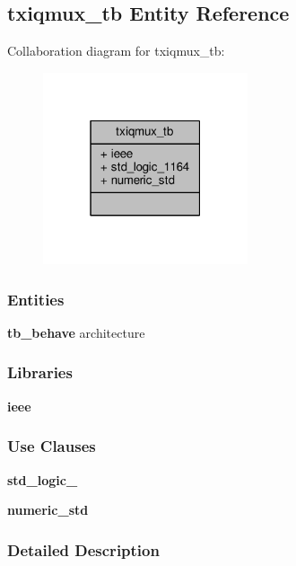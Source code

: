 \subsection{txiqmux\+\_\+tb Entity Reference}
\label{classtxiqmux__tb}


Collaboration diagram for txiqmux\+\_\+tb\+:\nopagebreak
\begin{figure}[H]
\begin{center}
\leavevmode
\includegraphics[width=171pt]{d8/d8e/classtxiqmux__tb__coll__graph}
\end{center}
\end{figure}
\subsubsection*{Entities}
\begin{DoxyCompactItemize}
\item 
{\bf tb\+\_\+behave} architecture
\end{DoxyCompactItemize}
\subsubsection*{Libraries}
 \begin{DoxyCompactItemize}
\item 
{\bf ieee} 
\end{DoxyCompactItemize}
\subsubsection*{Use Clauses}
 \begin{DoxyCompactItemize}
\item 
{\bf std\+\_\+logic\+\_}   
\item 
{\bf numeric\+\_\+std}   
\end{DoxyCompactItemize}


\subsubsection{Detailed Description}


